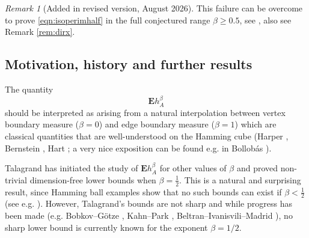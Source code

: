 \documentclass[12pt]{amsart}
\theoremstyle{plain}
\theoremstyle{definition}
\theoremstyle{remark}
\newtheorem{rem}[thm]{Remark}
\numberwithin{equation}{section}
\begin{document}
\begin{rem}[Added in revised version, August 2026]
This failure can be overcome to prove \eqref{eqn:isoperimhalf} in the full conjectured range $\beta\ge 0.5$, see \cite{DIRX26}, also see Remark \ref{rem:dirx}.
\end{rem}

\subsection{Motivation, history and further results}
The quantity \[\mathbf{E} h_A^\beta\] should be interpreted as arising from a natural interpolation between vertex boundary measure ($\beta=0$) and edge boundary measure ($\beta=1$) which are classical quantities that are well-understood on the Hamming cube (Harper \cite{Har66}, Bernstein \cite{Ber67}, Hart \cite{Hart76}; a very nice exposition can be found e.g. in Bollob\'as \cite[\S 16]{Bol86}).

Talagrand \cite{Tal93} has initiated the study of $\mathbf{E} h_A^\beta$ for other values of $\beta$ and proved non-trivial dimension-free lower bounds when $\beta=\frac12$. This is a natural and surprising result, since Hamming ball examples show that no such bounds can exist if $\beta<\frac12$ (see e.g. \cite[\S 3]{BIM23}). 
However, Talagrand's bounds are not sharp and while progress has been made (e.g. Bobkov--G\"otze \cite{BG99}, Kahn--Park \cite{KP20}, Beltran--Ivanisvili--Madrid \cite{BIM23}), no sharp lower bound is currently known for the exponent $\beta=1/2$. 
\end{document}
